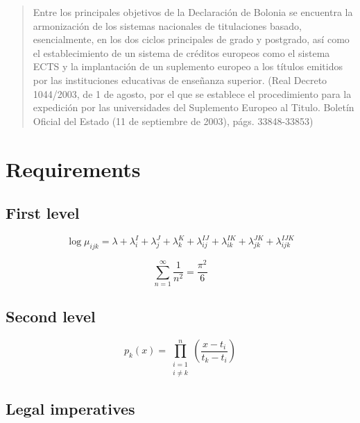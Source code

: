 \documentclass[12pt]{report} %
\begin{document}
\lipsum[9-10]

\blockquote{Entre los principales objetivos de la Declaración de Bolonia se encuentra la armonización de los sistemas nacionales de titulaciones basado, esencialmente, en los dos ciclos principales de grado y postgrado, así como	el establecimiento de un sistema de créditos europeos como el sistema ECTS y la implantación de un suplemento europeo a los títulos emitidos por las instituciones educativas de  enseñanza  superior. (Real  Decreto  1044/2003,  de  1  de  agosto,  por  el  que  se  establece  el  procedimiento para la expedición por las universidades del Suplemento Europeo al Titulo. Boletín Oficial del Estado (11 de septiembre de 2003), págs. 33848-33853)}

\lipsum[20-22]

\section{Requirements}

\lipsum[15]

\subsection{First level}
\lipsum[15-16]

\begin{equation} %
\log \mu_{ijk}= \lambda + \lambda_i ^I + \lambda_j ^J+\lambda_k ^K+\lambda_{ij} ^{IJ}+\lambda_{ik} ^{IK}+\lambda_{jk} ^{JK}+\lambda_{ijk} ^{IJK}
\end{equation}

\lipsum[17]
\begin{equation}
	\sum_{n=1}^\infty\frac{1}{n^2}=\frac{\pi^2}{6}
\end{equation}


\lipsum[18]
	
\subsection{Second level}
\lipsum[8]
\begin{equation}
p_k(x)=\prod_{\substack{i=1\\i\ne k}}^n
\left(\frac{x-t_i}{t_k-t_i}\right)
\end{equation}

\lipsum[9]

\subsection{Legal imperatives}
\lipsum[8]
\end{document}
